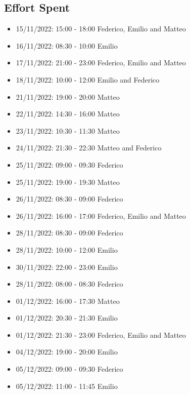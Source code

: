 \subsection{Effort Spent}
\begin{itemize}
    \item 15/11/2022: 15:00 - 18:00 Federico, Emilio and Matteo
    \item 16/11/2022: 08:30 - 10:00 Emilio
    \item 17/11/2022: 21:00 - 23:00 Federico, Emilio and Matteo
    \item 18/11/2022: 10:00 - 12:00 Emilio and Federico
    \item 21/11/2022: 19:00 - 20:00 Matteo
    \item 22/11/2022: 14:30 - 16:00 Matteo
    \item 23/11/2022: 10:30 - 11:30 Matteo
    \item 24/11/2022: 21:30 - 22:30 Matteo and Federico
    \item 25/11/2022: 09:00 - 09:30 Federico
    \item 25/11/2022: 19:00 - 19:30 Matteo
    \item 26/11/2022: 08:30 - 09:00 Federico
    \item 26/11/2022: 16:00 - 17:00 Federico, Emilio and Matteo
    \item 28/11/2022: 08:30 - 09:00 Federico
    \item 28/11/2022: 10:00 - 12:00 Emilio
    \item 30/11/2022: 22:00 - 23:00 Emilio
    \item 28/11/2022: 08:00 - 08:30 Federico
    \item 01/12/2022: 16:00 - 17:30 Matteo
    \item 01/12/2022: 20:30 - 21:30 Emilio
    \item 01/12/2022: 21:30 - 23:00 Federico, Emilio and Matteo
    \item 04/12/2022: 19:00 - 20:00 Emilio
    \item 05/12/2022: 09:00 - 09:30 Federico
    \item 05/12/2022: 11:00 - 11:45 Emilio
\end{itemize}